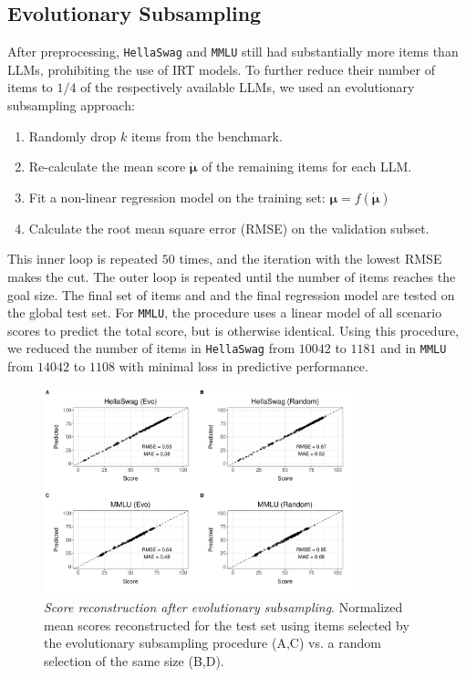 \documentclass{article}
\begin{document}
\subsection{Evolutionary Subsampling}
After preprocessing, \texttt{HellaSwag} and \texttt{MMLU} still had substantially more items than LLMs, prohibiting the use of IRT models. To further reduce their number of items to $1/4$ of the respectively available LLMs, we used an evolutionary subsampling approach:
\begin{enumerate}
   \item Randomly drop $k$ items from the benchmark.
   \item Re-calculate the mean score $\dot {\boldsymbol{\mu}}$ of the remaining items for each LLM.
   \item Fit a non-linear regression model on the training set: $\boldsymbol\mu = f(\dot{\boldsymbol\mu})$ 
   \item Calculate the root mean square error (RMSE) on the validation subset.
\end{enumerate}
This inner loop is repeated $50$ times, and the iteration with the lowest RMSE makes the cut. The outer loop is repeated until the number of items reaches the goal size. The final set of items and and the final regression model are tested on the global test set. For \texttt{MMLU}, the procedure uses a linear model of all scenario scores to predict the total score, but is otherwise identical.
Using this procedure, we reduced the number of items in \texttt{HellaSwag} from $10042$ to $1181$ and in \texttt{MMLU} from $14042$ to $1108$ with minimal loss in predictive performance.
\begin{figure}[h]
   \centering
   \includegraphics[width=0.8\textwidth]{figures/evo.pdf}
   \caption{\textit{Score reconstruction after evolutionary subsampling}. Normalized mean scores reconstructed for the test set using items selected by the evolutionary subsampling procedure (A,C) vs. a random selection of the same size (B,D).}
   \label{fig:hs-reduced}
\end{figure}
\end{document}
